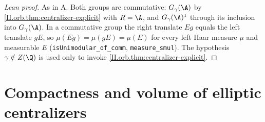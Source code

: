 \begin{proof}[Lean proof]
As in A. Both groups are commutative: $G_\gamma(\A)$ by \cref{II.orb.thm:centralizer-explicit} with $R=\A$, and $G_\gamma(\A)^1$ through its inclusion into $G_\gamma(\A)$. In a commutative group the right translate $Eg$ equals the left translate $gE$, so $\mu(Eg)=\mu(gE)=\mu(E)$ for every left Haar measure $\mu$ and measurable $E$ (\texttt{isUnimodular\_of\_comm}, \texttt{measure\_smul}). The hypothesis $\gamma\notin Z(\Q)$ is used only to invoke \cref{II.orb.thm:centralizer-explicit}.
\end{proof}

\section{Compactness and volume of elliptic centralizers}\label{sec:orb-compact}

